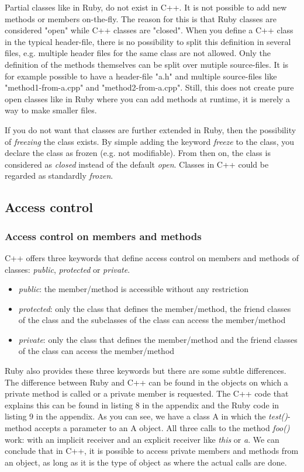 \documentclass[10pt,a4paper,twocolumn]{article}
\begin{document}
Partial classes like in Ruby, do not exist in C++. It is not possible to add new methods or members on-the-fly. The reason for this is that Ruby classes are considered "open" while C++ classes are "closed". When you define a C++ class in the typical header-file, there is no possibility to split this definition in several files, e.g. multiple header files for the same class are not allowed. Only the definition of the methods themselves can be split over mutiple source-files. It is for example possible to have a header-file "a.h" and multiple source-files like "method1-from-a.cpp" and "method2-from-a.cpp". Still, this does not create pure open classes like in Ruby where you can add methods at runtime, it is merely a way to make smaller files.

If you do not want that classes are further extended in Ruby, then the possibility of \textit{freezing} the class exists. By simple adding the keyword \textit{freeze} to the class, you declare the class as frozen (e.g. not modifiable). From then on, the class is considered as \textit{closed} instead of the default \textit{open}. Classes in C++ could be regarded as standardly \textit{frozen}.

\subsection{Access control}

\subsubsection{Access control on members and methods}
C++ offers three keywords that define access control on members and methods of classes: \textit{public}, \textit{protected} or \textit{private}. 

\begin{itemize}
\item \textit{public}: the member/method is accessible without any restriction
\item \textit{protected}: only the class that defines the member/method, the friend classes of the class and the subclasses of the class can access the member/method
\item \textit{private}: only the class that defines the member/method and the friend classes of the class can access the member/method
\end{itemize}

Ruby also provides these three keywords but there are some subtle differences. The difference between Ruby and C++ can be found in the objects on which a private method is called or a private member is requested. The C++ code that explains this can be found in listing 8 in the appendix and the Ruby code in listing 9 in the appendix. As you can see, we have a class A in which the \textit{test()}-method accepts a parameter to an A object. All three calls to the method \textit{foo()} work: with an implicit receiver and an explicit receiver like \textit{this} or \textit{a}. We can conclude that in C++, it is possible to access private members and methods from an object, as long as it is the type of object as where the actual calls are done. 
\end{document}
